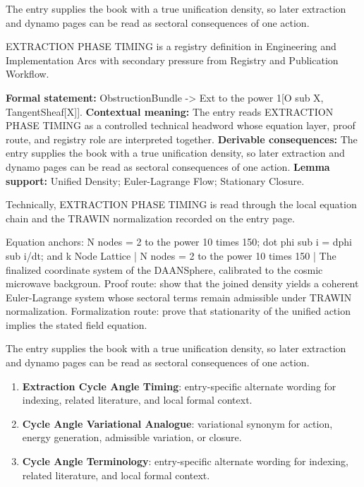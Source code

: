 The entry supplies the book with a true unification density, so later extraction and dynamo pages can be read as sectoral consequences of one action.
\clearpage


\begingroup\small
{}
EXTRACTION PHASE TIMING is a registry definition in Engineering and Implementation Arcs with secondary pressure from Registry and Publication Workflow.

\begingroup\footnotesize\setlength{\emergencystretch}{3em}\sloppy
\textbf{Formal statement:} ObstructionBundle -> Ext to the power 1[O sub X, TangentSheaf[X]]. \textbf{Contextual meaning:} The entry reads EXTRACTION PHASE TIMING as a controlled technical headword whose equation layer, proof route, and registry role are interpreted together. \textbf{Derivable consequences:} The entry supplies the book with a true unification density, so later extraction and dynamo pages can be read as sectoral consequences of one action. \textbf{Lemma support:} Unified Density; Euler-Lagrange Flow; Stationary Closure.\par
\endgroup

Technically, EXTRACTION PHASE TIMING is read through the local equation chain and the TRAWIN normalization recorded on the entry page.

Equation anchors: N nodes = 2 to the power 10 times 150; dot phi sub i = dphi sub i/dt; and k Node Lattice | N nodes = 2 to the power 10 times 150 | The finalized coordinate system of the DAANSphere, calibrated to the cosmic microwave backgroun. Proof route: show that the joined density yields a coherent Euler-Lagrange system whose sectoral terms remain admissible under TRAWIN normalization. Formalization route: prove that stationarity of the unified action implies the stated field equation.

The entry supplies the book with a true unification density, so later extraction and dynamo pages can be read as sectoral consequences of one action.
\endgroup

\begin{enumerate}[leftmargin=1.6em,itemsep=6pt,topsep=4pt]
\item \textbf{Extraction Cycle Angle Timing}: entry-specific alternate wording for indexing, related literature, and local formal context.
\item \textbf{Cycle Angle Variational Analogue}: variational synonym for action, energy generation, admissible variation, or closure.
\item \textbf{Cycle Angle Terminology}: entry-specific alternate wording for indexing, related literature, and local formal context.
\end{enumerate}

